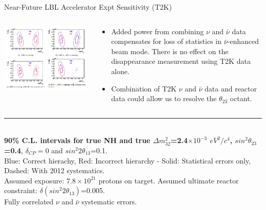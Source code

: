 \begin{frame}{Near-Future LBL Accelerator Expt Sensitivity (T2K)}

\begin{columns}[T]
  \begin{column}{0.60\textwidth}
  {
    \begin{center}
     \includegraphics[width=0.99\textwidth]{./images/3nu/accelerator/future_sensitivity/t2k/disapp_dm_vs_sinsq23_90cl_2octants_2x2.png}\\
    \end{center}
    \vspace{0.2cm}
  }
  \end{column}
  \begin{column}{0.40\textwidth}
    \vspace{0.4cm}
    {\scriptsize
     \begin{itemize}
        \item Added power from combining $\nu$ and $\bar{\nu}$ data
              compensates for loss of statistics in  $\bar{\nu}$-enhanced beam mode.
              There is no effect on the disappearance measurement using T2K data alone.
        \vspace{0.2cm}
        \item Combination of T2K $\nu$ and $\bar{\nu}$ data and reactor data
              could allow us to resolve the $\theta_{23}$ octant.
     \end{itemize}
    }
  \end{column}
\end{columns}
\noindent\rule{2cm}{0.4pt}\\
{\tiny
  {\bf 90\% C.L. intervals for true NH and true ${\Delta}m^{2}_{32}$=2.4$\times10^{-3}$ $eV^{2}/c^{4}$, $sin^{2}{\theta}_{23}$=0.4},
      ${\delta}_{CP}=0$ and $sin^{2}2{\theta}_{13}$=0.1.\\
      Blue: Correct hierachy, Red: Incorrect hierarchy -
      Solid: Statistical errors only, Dashed: With 2012 systematics.\\
      Assumed exposure: $7.8\times10^{21}$ protons on target.
      Assumed ultimate reactor constraint: $\delta(sin^{2}2{\theta}_{13})$=0.005.\\
      Fully correlated $\nu$ and $\bar{\nu}$ systematic errors.\\
}
\end{frame}
